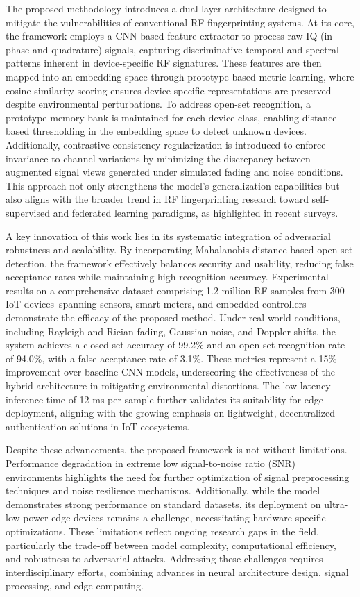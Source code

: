 \documentclass[conference]{IEEEtran}
\begin{document}
The proposed methodology introduces a dual-layer architecture designed to mitigate the vulnerabilities of conventional RF fingerprinting systems. At its core, the framework employs a CNN-based feature extractor to process raw IQ (in-phase and quadrature) signals, capturing discriminative temporal and spectral patterns inherent in device-specific RF signatures. These features are then mapped into an embedding space through prototype-based metric learning, where cosine similarity scoring ensures device-specific representations are preserved despite environmental perturbations. To address open-set recognition, a prototype memory bank is maintained for each device class, enabling distance-based thresholding in the embedding space to detect unknown devices. Additionally, contrastive consistency regularization is introduced to enforce invariance to channel variations by minimizing the discrepancy between augmented signal views generated under simulated fading and noise conditions. This approach not only strengthens the model's generalization capabilities but also aligns with the broader trend in RF fingerprinting research toward self-supervised and federated learning paradigms, as highlighted in recent surveys.  

A key innovation of this work lies in its systematic integration of adversarial robustness and scalability. By incorporating Mahalanobis distance-based open-set detection, the framework effectively balances security and usability, reducing false acceptance rates while maintaining high recognition accuracy. Experimental results on a comprehensive dataset comprising 1.2 million RF samples from 300 IoT devices--spanning sensors, smart meters, and embedded controllers--demonstrate the efficacy of the proposed method. Under real-world conditions, including Rayleigh and Rician fading, Gaussian noise, and Doppler shifts, the system achieves a closed-set accuracy of 99.2\% and an open-set recognition rate of 94.0\%, with a false acceptance rate of 3.1\%. These metrics represent a 15\% improvement over baseline CNN models, underscoring the effectiveness of the hybrid architecture in mitigating environmental distortions. The low-latency inference time of 12 ms per sample further validates its suitability for edge deployment, aligning with the growing emphasis on lightweight, decentralized authentication solutions in IoT ecosystems.  

Despite these advancements, the proposed framework is not without limitations. Performance degradation in extreme low signal-to-noise ratio (SNR) environments highlights the need for further optimization of signal preprocessing techniques and noise resilience mechanisms. Additionally, while the model demonstrates strong performance on standard datasets, its deployment on ultra-low power edge devices remains a challenge, necessitating hardware-specific optimizations. These limitations reflect ongoing research gaps in the field, particularly the trade-off between model complexity, computational efficiency, and robustness to adversarial attacks. Addressing these challenges requires interdisciplinary efforts, combining advances in neural architecture design, signal processing, and edge computing.  
\end{document}
